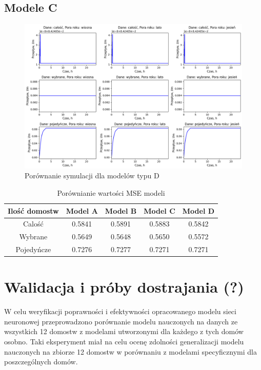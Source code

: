 \documentclass[a4paper,twoside,12pt]{book}
\begin{document}
\newpage
\subsection*{Modele C}
\begin{figure}[!h]
  \centering
  \includegraphics[width=1\textwidth]{img/Model_D.png}
  \caption{Porównanie symulacji dla modelów typu D}
  \label{fig:etykieta-rysunku}
\end{figure}

\begin{table}[!h]
  \centering
  \caption{Porównianie wartości MSE modeli}
  \begin{tabular}{|c|c|c|c|c|}
    \hline
    Ilość domostw & Model A & Model B & Model C & Model D \\ \hline
    Calość        & 0.5841  & 0.5891  & 0.5883  & 0.5842  \\ \hline
    Wybrane       & 0.5649  & 0.5648  & 0.5650  & 0.5572  \\ \hline
    Pojedyńcze    & 0.7276  & 0.7277  & 0.7271  & 0.7271  \\ \hline
  \end{tabular}
\end{table}

\newpage
\section{Walidacja i próby dostrajania (?)}
W celu weryfikacji poprawności i efektywności opracowanego modelu sieci neuronowej przeprowadzono porównanie modelu nauczonych na danych ze wszystkich 12 domostw z modelami utworzonymi dla każdego z tych domów osobno. Taki eksperyment miał na celu ocenę zdolności generalizacji modelu nauczonych na zbiorze 12 domostw w porównaniu z modelami specyficznymi dla poszczególnych domów.
\end{document}
